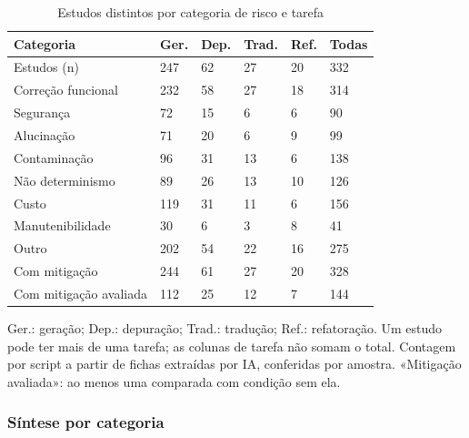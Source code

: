 \begin{table}[!t]
\centering
\footnotesize
\setlength{\tabcolsep}{3pt}
\caption{Estudos distintos por categoria de risco e tarefa}
\label{tab:riscos}
\begin{tabular}{p{2.6cm}p{0.75cm}p{0.75cm}p{0.75cm}p{0.75cm}p{0.75cm}}
\hline
Categoria & Ger. & Dep. & Trad. & Ref. & Todas \\
\hline
Estudos (n) & 247 & 62 & 27 & 20 & 332 \\
\hline
Correção funcional & 232 & 58 & 27 & 18 & 314 \\
Segurança & 72 & 15 & 6 & 6 & 90 \\
Alucinação & 71 & 20 & 6 & 9 & 99 \\
Contaminação & 96 & 31 & 13 & 6 & 138 \\
Não determinismo & 89 & 26 & 13 & 10 & 126 \\
Custo & 119 & 31 & 11 & 6 & 156 \\
Manutenibilidade & 30 & 6 & 3 & 8 & 41 \\
Outro & 202 & 54 & 22 & 16 & 275 \\
\hline
Com mitigação & 244 & 61 & 27 & 20 & 328 \\
Com mitigação avaliada & 112 & 25 & 12 & 7 & 144 \\
\hline
\end{tabular}
\par\smallskip
\parbox{\columnwidth}{\scriptsize Ger.: geração; Dep.: depuração; Trad.: tradução; Ref.: refatoração. Um estudo pode ter mais de uma tarefa; as colunas de tarefa não somam o total. Contagem por script a partir de fichas extraídas por IA, conferidas por amostra. «Mitigação avaliada»: ao menos uma comparada com condição sem ela.}
\end{table}

\subsubsection{Síntese por categoria}

